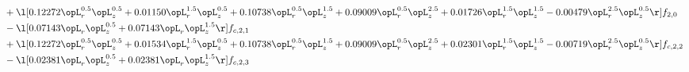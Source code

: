\begin{alignat}{2}
& + \l[  0.12272 \opL_r^{0.5} \opL_z^{0.5} +  0.01150 \opL_r^{1.5} \opL_z^{0.5} +  0.10738 \opL_r^{0.5} \opL_z^{1.5} +  0.09009 \opL_r^{0.5} \opL_z^{2.5} +  0.01726 \opL_r^{1.5} \opL_z^{1.5}   -0.00479 \opL_r^{2.5} \opL_z^{0.5}  \r] f_{2,0} \nonumber \\ 
& - \l[  0.07143 \opL_r \opL_z^{0.5} +  0.07143 \opL_r \opL_z^{1.5}  \r] f_{c,2,1} \nonumber \\ 
& + \l[  0.12272 \opL_r^{0.5} \opL_z^{0.5} +  0.01534 \opL_r^{1.5} \opL_z^{0.5} +  0.10738 \opL_r^{0.5} \opL_z^{1.5} +  0.09009 \opL_r^{0.5} \opL_z^{2.5} +  0.02301 \opL_r^{1.5} \opL_z^{1.5}   -0.00719 \opL_r^{2.5} \opL_z^{0.5}  \r] f_{c,2,2} \nonumber \\ 
& - \l[  0.02381 \opL_r \opL_z^{0.5} +  0.02381 \opL_r \opL_z^{1.5}  \r] f_{c,2,3} \nonumber \\ 
\end{alignat} 


